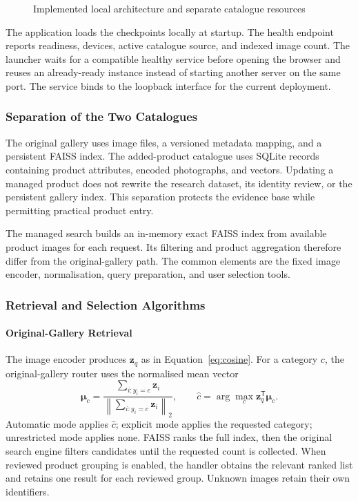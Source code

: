 \begin{figure}[H]\centering

\caption{Implemented local architecture and separate catalogue resources}
\label{fig:architecture}\end{figure}

The application loads the checkpoints locally at startup. The health endpoint
reports readiness, devices, active catalogue source, and indexed image count.
The launcher waits for a compatible healthy service before opening the browser
and reuses an already-ready instance instead of starting another server on the
same port. The service binds to the loopback interface for the current deployment.

\subsubsection{Separation of the Two Catalogues}
The original gallery uses image files, a versioned metadata mapping, and a
persistent FAISS index. The added-product catalogue uses SQLite records containing
product attributes, encoded photographs, and vectors. Updating a managed product
does not rewrite the research dataset, its identity review, or the persistent
gallery index. This separation protects the evidence base while permitting
practical product entry.

The managed search builds an in-memory exact FAISS index from available product
images for each request. Its filtering and product aggregation therefore differ
from the original-gallery path. The common elements are the fixed image encoder,
normalisation, query preparation, and user selection tools.
\subsubsection{Retrieval and Selection Algorithms}
\paragraph{Original-Gallery Retrieval}
The image encoder produces $\mathbf{z}_q$ as in Equation~\ref{eq:cosine}. For a
category $c$, the original-gallery router uses the normalised mean vector
\begin{equation}
 \boldsymbol{\mu}_c=
 \frac{\sum_{i:y_i=c}\mathbf{z}_i}
 {\left\lVert\sum_{i:y_i=c}\mathbf{z}_i\right\rVert_2},\qquad
 \widehat c=\arg\max_c \mathbf{z}_q^{\mathsf T}\boldsymbol{\mu}_c.
\end{equation}
Automatic mode applies $\widehat c$; explicit mode applies the requested category;
unrestricted mode applies none. FAISS ranks the full index, then the original
search engine filters candidates until the requested count is collected. When
reviewed product grouping is enabled, the handler obtains the relevant ranked
list and retains one result for each reviewed group. Unknown images retain their
own identifiers.

